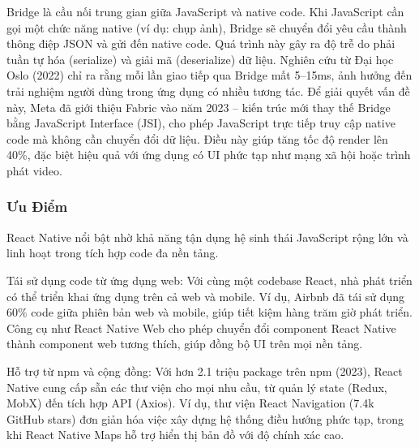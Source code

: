     \begin{flushleft}
      \hspace*{0.8cm}Bridge là cầu nối trung gian giữa JavaScript và native code. Khi JavaScript cần gọi một chức năng native (ví dụ: chụp ảnh), Bridge sẽ chuyển đổi yêu cầu thành thông điệp JSON và gửi đến native code. Quá trình này gây ra độ trễ do phải tuần tự hóa (serialize) và giải mã (deserialize) dữ liệu. Nghiên cứu từ Đại học Oslo (2022) chỉ ra rằng mỗi lần giao tiếp qua Bridge mất 5–15ms, ảnh hưởng đến trải nghiệm người dùng trong ứng dụng có nhiều tương tác. Để giải quyết vấn đề này, Meta đã giới thiệu Fabric vào năm 2023 – kiến trúc mới thay thế Bridge bằng JavaScript Interface (JSI), cho phép JavaScript trực tiếp truy cập native code mà không cần chuyển đổi dữ liệu. Điều này giúp tăng tốc độ render lên 40\%, đặc biệt hiệu quả với ứng dụng có UI phức tạp như mạng xã hội hoặc trình phát video.
    \end{flushleft}

\subsubsection{Ưu Điểm}
    \begin{flushleft}
      \hspace*{0.8cm}React Native nổi bật nhờ khả năng tận dụng hệ sinh thái JavaScript rộng lớn và linh hoạt trong tích hợp code đa nền tảng.
    \end{flushleft}

    \begin{flushleft}
        \hspace*{0.8cm}Tái sử dụng code từ ứng dụng web: Với cùng một codebase React, nhà phát triển có thể triển khai ứng dụng trên cả web và mobile. Ví dụ, Airbnb đã tái sử dụng 60\% code giữa phiên bản web và mobile, giúp tiết kiệm hàng trăm giờ phát triển. Công cụ như React Native Web cho phép chuyển đổi component React Native thành component web tương thích, giúp đồng bộ UI trên mọi nền tảng.
      \end{flushleft}

      \begin{flushleft}
        \hspace*{0.8cm}Hỗ trợ từ npm và cộng đồng: Với hơn 2.1 triệu package trên npm (2023), React Native cung cấp sẵn các thư viện cho mọi nhu cầu, từ quản lý state (Redux, MobX) đến tích hợp API (Axios). Ví dụ, thư viện React Navigation (7.4k GitHub stars) đơn giản hóa việc xây dựng hệ thống điều hướng phức tạp, trong khi React Native Maps hỗ trợ hiển thị bản đồ với độ chính xác cao.
      \end{flushleft}

